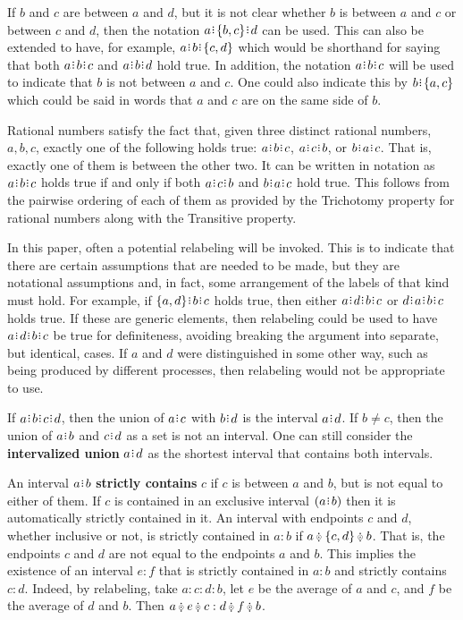 \documentclass[12pt]{article}
\begin{document}
If $b$ and $c$ are between $a$ and $d$, but it is not clear whether $b$ is between $a$ and $c$ or between $c$ and $d$, then the notation $a\rint \{b,c\}\rint d$ can be used. This can also be extended to have, for example, $a\rint b\rint \{c,d\}$ which would be shorthand for saying that both $a\rint b\rint c$ and $a\rint b\rint d$ hold true. In addition, the notation \sout{$a\rint b\rint c$} will be used to indicate that $b$ is not between $a$ and $c$. One could also indicate this by $b\rint \{a,c\}$ which could be said in words that $a$ and $c$ are on the same side of $b$. 

Rational numbers satisfy the fact that, given three distinct rational numbers, $a, b, c$, exactly one of the following holds true:  $a\rint b\rint c$, $a\rint c\rint b$, or $b\rint a\rint c$. That is, exactly one of them is between the other two. It can be written in notation as $a\rint b\rint c$ holds true if and only if both \sout{$a\rint c\rint b$} and \sout{$b\rint a\rint c$} hold true. This follows from the pairwise ordering of each of them as provided by the Trichotomy property for rational numbers along with the Transitive property. 

In this paper, often a potential relabeling will be invoked. This is to indicate that there are certain assumptions that are needed to be made, but they are notational assumptions and, in fact, some arrangement of the labels of that kind must hold. For example, if $\{a,d\}\rint b\rint c$ holds true, then either $a\rint d\rint b\rint c$ or $d\rint a\rint b\rint c$ holds true. If these are generic elements, then relabeling could be used to have $a\rint d\rint b\rint c$  be  true for definiteness, avoiding breaking the argument into separate, but identical, cases. If $a$ and $d$ were distinguished in some other way, such as being produced by different processes, then relabeling would not be appropriate to use. 

If $a\rint b\rint c\rint d$, then the union of $a\rint c$ with $b\rint d$ is the interval $a\rint d$. If $b \neq c$, then the union of $a\rint b$ and $c\rint d$ as a set is not an interval. One can still consider the \textbf{intervalized union} $a\rint d$ as the shortest interval that contains both intervals. 

An interval $a\rint b$ \textbf{strictly contains} $c$ if $c$ is between $a$ and $b$, but is not equal to either of them. If $c$ is contained in an exclusive interval $(a\rint b)$ then it is automatically strictly contained in it. An interval with endpoints $c$ and $d$, whether inclusive or not, is strictly contained in $a:b$ if $a \betneq \{c, d\} \betneq b$. That is, the endpoints $c$ and $d$ are not equal to the endpoints $a$ and $b$. This implies the existence of an interval $e:f$ that is strictly contained in $a:b$ and strictly contains $c:d$. Indeed, by relabeling, take $a:c:d:b$, let $e$ be the average of $a$ and $c$, and $f$ be the average of $d$ and $b$. Then $a \betneq e \betneq c : d \betneq f \betneq b$.
\end{document}
